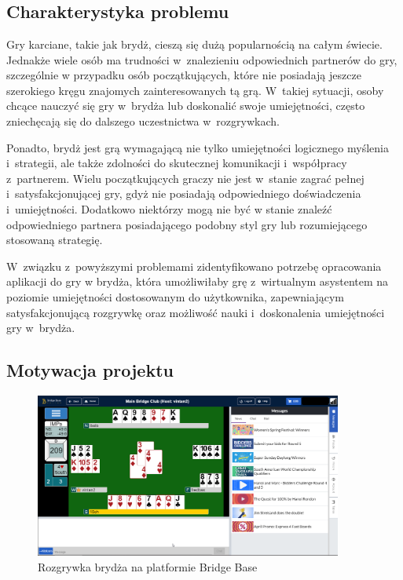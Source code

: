 \chapter{\ChapterTitleProjectVision}
\label{sec:cel-wizja}


\section{Charakterystyka problemu}

Gry karciane, takie jak brydż, cieszą się dużą popularnością na całym świecie.
Jednakże wiele osób ma trudności w~znalezieniu odpowiednich partnerów do gry,
szczególnie w przypadku osób początkujących, które nie posiadają jeszcze
szerokiego kręgu znajomych zainteresowanych tą grą. W~takiej sytuacji, osoby
chcące nauczyć się gry w~brydża lub doskonalić swoje umiejętności, często
zniechęcają się do dalszego uczestnictwa w~rozgrywkach.

Ponadto, brydż jest grą wymagającą nie tylko umiejętności logicznego myślenia
i~strategii, ale także zdolności do skutecznej komunikacji i~współpracy
z~partnerem. Wielu początkujących graczy nie jest w~stanie zagrać pełnej
i~satysfakcjonującej gry, gdyż nie posiadają odpowiedniego doświadczenia
i~umiejętności. Dodatkowo niektórzy mogą nie być w stanie znaleźć
odpowiedniego partnera posiadającego podobny styl gry lub
rozumiejącego stosowaną strategię.

W~związku z~powyższymi problemami zidentyfikowano potrzebę opracowania
aplikacji do gry w brydża, która umożliwiłaby grę z~wirtualnym asystentem
na poziomie umiejętności dostosowanym do użytkownika, zapewniającym satysfakcjonującą
rozgrywkę oraz możliwość nauki i~doskonalenia umiejętności gry w~brydża.


\section{Motywacja projektu}

\begin{figure}
    \centering
    \includegraphics[width=0.9\textwidth]{img/brydz-platformy/bridgebase.png}
    \caption{Rozgrywka brydża na platformie Bridge Base}
    \label{fig:bridge-base}
\end{figure}

